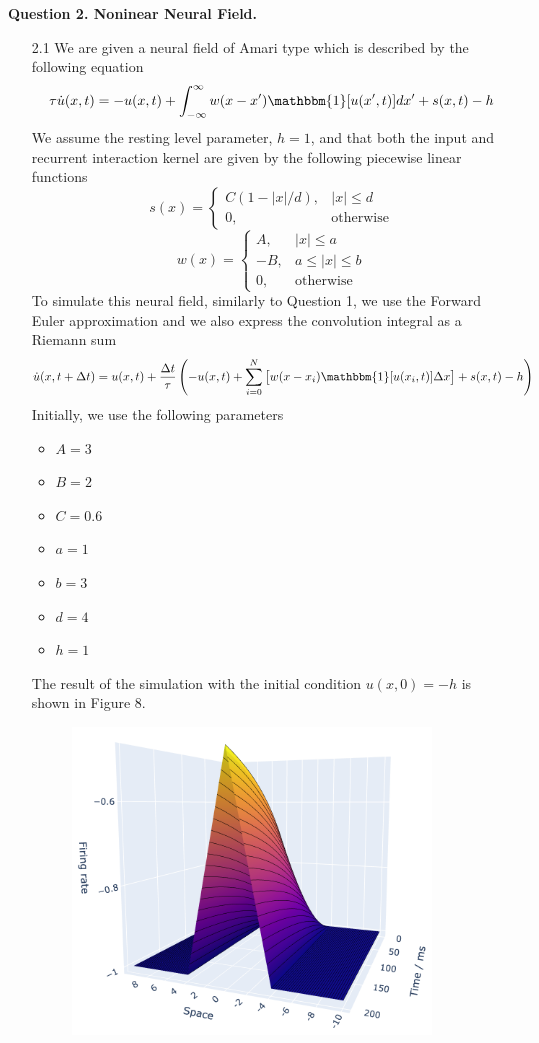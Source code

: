 \documentclass[12pt]{article}
\begin{document}
\newpage
\noindent\textbf{Question 2. Noninear Neural Field.}
\begin{enumerate}
\item[2.1] We are given a neural field of Amari type which is described by the following equation
\begin{equation}
    \tau \dot{u}(x, t) =   -u(x, t) + \int_{-\infty}^{\infty}w(x-x')\mathbbm{1}[u(x', t)]dx' + s(x, t) - h
\end{equation}
We assume the resting level parameter, $h=1$, and that both the input and recurrent interaction kernel are given by the 
following piecewise linear functions
\[
    s(x)=\begin{cases}
        C(1-|x|/d), & |x| \leq d\\
        0, & \text{otherwise}
    \end{cases}  
\]
\[
    w(x)=\begin{cases}
        A, & |x| \leq a\\
        -B, & a \leq |x| \leq b\\
        0, & \text{otherwise}
    \end{cases} 
\]
To simulate this neural field, similarly to Question 1, we use the Forward Euler approximation and we also 
express the convolution integral as a Riemann sum
\[
    \dot{u}(x, t+\Delta t) = u(x, t) + \frac{\Delta t}{\tau}\left(-u(x, t) + \sum_{i=0}^{N}\big[ w(x-x_{i})\mathbbm{1}[u(x_{i}, t)]\Delta x \big] + s(x, t) - h\right)
\]
Initially, we use the following parameters
\begin{itemize}
    \item $A=3$
    \item $B=2$
    \item $C=0.6$
    \item $a=1$
    \item $b=3$
    \item $d=4$
    \item $h=1$
\end{itemize}
The result of the simulation with the initial condition $u(x, 0)=-h$ is shown in Figure 8.
\begin{figure}[H]
    \centering
    \includegraphics[width=0.9\textwidth]{./figure8.png}

\end{figure}
\end{enumerate}
\end{document}
